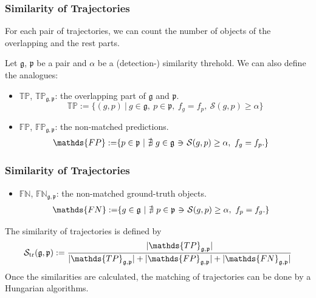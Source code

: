 \documentclass[slidetop, mathserif]{beamer}
\newcommand{\suchthat}{-\hspace{-10pt}\ni\hspace{-10pt}-}
\begin{document}
\begin{frame}
	\frametitle{Similarity of Trajectories}
			
	For each pair of trajectories,
	we can count the number of objects of the overlapping and the rest parts.
			
	\vspace{5pt}
			
	Let $\mathfrak g$, $\mathfrak p$ be a pair
	and $\alpha$ be a (detection-) similarity threhold.
	We can also define the analogues:

	\vspace{5pt}

	\begin{itemize}
		\item $\mathds{TP}$, $\mathds{TP}_{\mathfrak g, \mathfrak p}$:
		      the overlapping part of $\mathfrak g$ and $\mathfrak p$.
		      \[
		      	\mathds{TP} := \{(g,p)\ |\ 
		      	g\in\mathfrak g,~
		      	p\in\mathfrak p,~
		      	f_g=f_p,~ \mathcal S(g,p)\geq \alpha\}
		      \]
		\item $\mathds{FP}$, $\mathds{FP}_{\mathfrak g, \mathfrak p}$:
		      the non-matched predictions.
		      \begin{align*}
		      	\mathds{FP} := & \{ p\in\mathfrak p\ |\ 
		      	\nexists\ g\in\mathfrak g ~\suchthat~ \mathcal S(g,p)\geq\alpha,~ f_g=f_p.\}
		      \end{align*}
	\end{itemize}
			
\end{frame}

\begin{frame}
	\frametitle{Similarity of Trajectories}
			
	\begin{itemize}
		\item $\mathds{FN}$, $\mathds{FN}_{\mathfrak g, \mathfrak p}$: the non-matched ground-truth objects.
		      \begin{align*}
		      	\mathds{FN} := & \{ g\in\mathfrak g\ |\ 
		      	\nexists\ p\in\mathfrak p ~\suchthat~ \mathcal S(g,p)\geq\alpha,~ f_p=f_g.\}
		      \end{align*}
	\end{itemize}
			
	The similarity of trajectories is defined by
	\[
		\mathcal S_{\rm tr}(\mathfrak g, \mathfrak p) :=
		\dfrac{|\mathds{TP}_{\mathfrak g,\mathfrak p}|}{
			|\mathds{TP}_{\mathfrak g,\mathfrak p}|+|\mathds{FP}_{\mathfrak g,\mathfrak p}|+|\mathds{FN}_{\mathfrak g,\mathfrak p}|
		}
	\]
	Once the similarities are calculated,
	the matching of trajectories can be done by a Hungarian algorithms.
\end{frame}
\end{document}
